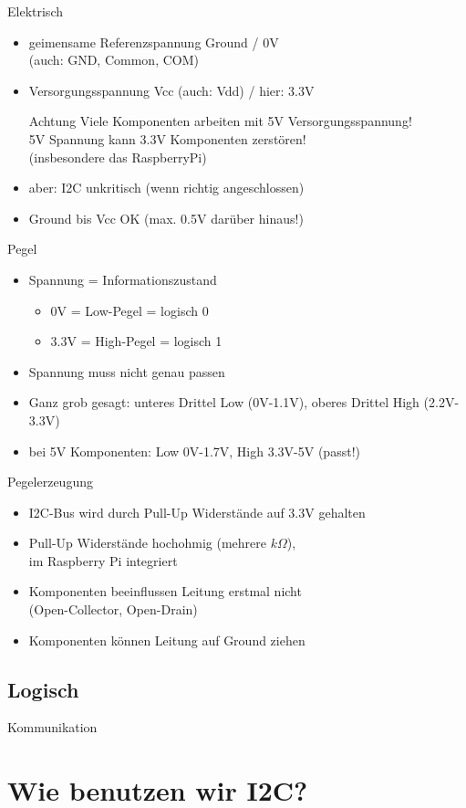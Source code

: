 \documentclass{beamer}
\begin{document}
\begin{frame}{Elektrisch}
 \begin{itemize}
  \item geimensame Referenzspannung Ground / 0V\\(auch: GND, Common, COM)
  \item Versorgungsspannung Vcc (auch: Vdd) / hier: 3.3V
    \begin{alertblock}{Achtung}
     Viele Komponenten arbeiten mit 5V Versorgungsspannung!\\
     5V Spannung kann 3.3V Komponenten zerstören!\\
     (insbesondere das RaspberryPi)
    \end{alertblock}
  \item aber: I2C unkritisch (wenn richtig angeschlossen)
  \item Ground bis Vcc OK (max. 0.5V darüber hinaus!)
 \end{itemize}
\end{frame}

\begin{frame}{Pegel}
 \begin{itemize}
   \item Spannung = Informationszustand
    \begin{itemize}
      \item 0V = Low-Pegel = logisch 0
      \item 3.3V = High-Pegel = logisch 1
    \end{itemize}
  \item Spannung muss nicht genau passen
  \item Ganz grob gesagt: unteres Drittel Low (0V-1.1V), oberes Drittel High (2.2V-3.3V)
  \item bei 5V Komponenten: Low 0V-1.7V, High 3.3V-5V (passt!)
 \end{itemize}
\end{frame}

\begin{frame}{Pegelerzeugung}
 \begin{itemize}
   \item I2C-Bus wird durch Pull-Up Widerstände auf 3.3V gehalten
   \item Pull-Up Widerstände hochohmig (mehrere $k\Omega$),\\im Raspberry Pi integriert
   \item Komponenten beeinflussen Leitung erstmal nicht\\(Open-Collector, Open-Drain)
   \item Komponenten können Leitung auf Ground ziehen
 \end{itemize}
\end{frame}

\subsection{Logisch}

\begin{frame}{Kommunikation}
 \begin{itemize}
 \end{itemize}
\end{frame}

\section{Wie benutzen wir I2C?}
\end{document}
